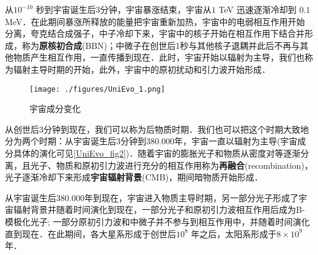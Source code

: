 从$10^{-10}$ 秒到宇宙诞生后3分钟，宇宙暴涨结束，宇宙从$1$ TeV 迅速逐渐冷却到 $0.1 $ MeV．在此期间暴涨所释放的能量把宇宙重新加热，宇宙中的电弱相互作用开始分离，夸克结合成强子，中子冷却下来，宇宙中的核子开始在相互作用下结合并形成，称为\textbf{原核初合成}(BBN)；中微子在创世后1秒与其他核子退耦并此后不再与其他物质产生相互作用，一直传播到现在．此时，宇宙开始以辐射为主导，我们也称为辐射主导时期的开始，此外，宇宙中的原初扰动和引力波开始形成．

\begin{figure}[ht]
\centering
\texttt{[image: ./figures/UniEvo\_1.png]}
\caption{宇宙成分变化} \label{UniEvo_fig2}
\end{figure}

从创世后3分钟到现在，我们可以称为后物质时期．我们也可以把这个时期大致地分为两个时期：从宇宙诞生后3分钟到380.000年，宇宙一直以辐射为主导(宇宙成分具体的演化可见\autoref{UniEvo_fig2})．随着宇宙的膨胀光子和物质从密度对等逐渐分离，且光子、物质和原初引力波进行充分的相互作用称为\textbf{再融合}(recombination)，光子逐渐冷却下来形成\textbf{宇宙辐射背景}(CMB)，期间暗物质开始形成．

从宇宙诞生后380.000年到现在，宇宙进入物质主导时期，另一部分光子形成了宇宙辐射背景并随着时间演化到现在，一部分光子和原初引力波相互作用后成为B-模极化光子; 一部分原初引力波和中微子并不参与到相互作用中，并随着时间演化直到现在．在此期间，各大星系形成于创世后$10^8$ 年之后，太阳系形成于$8\times 10^9$年．




